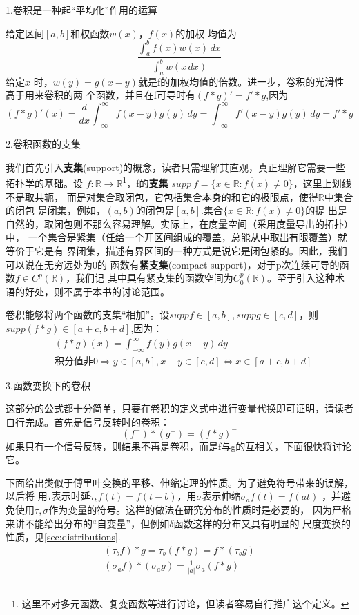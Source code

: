 \documentclass{ctexbook}
\begin{document}
\noindent 1.卷积是一种起“平均化”作用的运算

给定区间$[a,b]$和权函数$w(x)$，$f(x)$的加权
均值为\[\frac{\int_{a}^{b}f(x)w(x)\,dx}{\int_{a}^{b}w(x\,dx)}\]给定$x$
时，$w(y)=g(x-y)$就是f的加权均值的倍数。进一步，卷积的光滑性高于用来卷积的两
个函数，并且在f可导时有$(f*g)'=f'*g$,因为
\[(f*g)'(x)=\frac{d}{dx}\int_{-\infty}^{\infty}f(x-y)g(y)\,dy=\int_{-\infty}^{\infty}f'(x-y)g(y)\,dy=f'*g\]

\noindent 2.卷积函数的支集

我们首先引入\textbf{支集}(support)的概念，读者只需理解其直观，真正理解它需要一些拓扑学的基础。设
$f:\mathbb{R}\to \mathbb{R}$\footnote{这里不对多元函数、复变函数等进行讨论，但读者容易自行推广这个定义。}，f的\textbf{支集}
$supp\ f=\overline{\{x\in\mathbb{R}:f(x)\neq 0\}}$，这里上划线不是取共轭，
而是对集合取闭包，它包括集合本身的和它的极限点，使得$\mathbb{R}$中集合的闭包
是闭集，例如，$(a,b)$的闭包是$[a,b]$.集合$\{x\in\mathbb{R}:f(x)\neq 0\}$的提
出是自然的，取闭包则不那么容易理解。实际上，在度量空间（采用度量导出的拓扑）中，
一个集合是紧集（任给一个开区间组成的覆盖，总能从中取出有限覆盖）就等价于它是有
界闭集，描述有界区间的一种方式是说它是闭包紧的。因此，我们可以说在无穷远处为0的
函数有\textbf{紧支集}(compact support)，对于p次连续可导的函数$f\in C^p(\mathbb{R})$，我们记
其中具有紧支集的函数空间为$C_0^p(\mathbb{R})$。至于引入这种术语的好处，则不属于本书的讨论范围。

卷积能够将两个函数的支集“相加”。设$supp f\in [a,b],supp g\in [c,d]$，则
$supp (f*g)\in [a+c,b+d]$,因为：
\begin{align*}
     & (f*g)(x) =\int_{-\infty}^{\infty}f(y)g(x-y)\,dy                               \\
     & \text{积分值非0}\Rightarrow y\in [a,b],x-y\in [c,d]\Leftrightarrow x\in [a+c,b+d]
\end{align*}

\noindent 3.函数变换下的卷积

这部分的公式都十分简单，只要在卷积的定义式中进行变量代换即可证明，请读者自行完成。首先是信号反转时的卷积：
\[(f^-)*(g^-)=(f*g)^-\]
如果只有一个信号反转，则结果不再是卷积，而是f与g的互相关，下面很快将讨论它。

下面给出类似于傅里叶变换的平移、伸缩定理的性质。为了避免符号带来的误解，以后将
用$\tau$表示时延$\tau_b f(t)=f(t-b)$，用$\sigma$表示伸缩$\sigma_a f(t)=f(at)$
，并避免使用$\tau,\sigma$作为变量的符号。这样的做法在研究分布的性质时是必要的，
因为严格来讲不能给出分布的“自变量”，但例如$\delta$函数这样的分布又具有明显的
尺度变换的性质，见\ref{sec:distributions}.
\begin{align*}
    (\tau_b f)*g=\tau_b (f*g)=f*(\tau_b g) \\
    (\sigma_a f)*(\sigma_a g)=\frac{1}{|a|}\sigma_a(f*g)
\end{align*}
\end{document}
